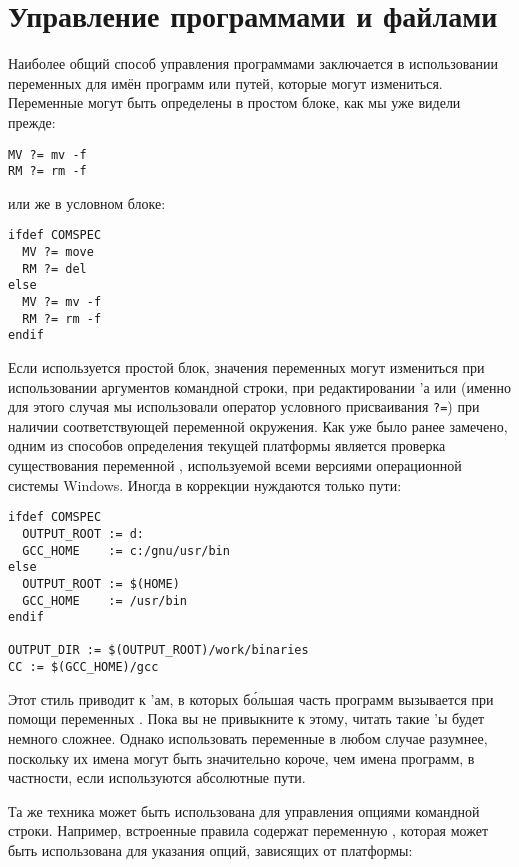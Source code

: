 \section{Управление программами и файлами}

Наиболее общий способ управления программами заключается в
использовании переменных для имён программ или путей, которые могут
измениться. Переменные могут быть определены в простом блоке, как мы
уже видели прежде:
{\footnotesize
\begin{verbatim}
MV ?= mv -f
RM ?= rm -f
\end{verbatim}
}
{\flushleft или же в условном блоке:}
{\footnotesize
\begin{verbatim}
ifdef COMSPEC
  MV ?= move
  RM ?= del
else
  MV ?= mv -f
  RM ?= rm -f
endif
\end{verbatim}
}

Если используется простой блок, значения переменных могут измениться
при использовании аргументов командной строки, при редактировании
\Makefile{}'а или (именно для этого случая мы использовали оператор
условного присваивания \texttt{?=}) при наличии соответствующей
переменной окружения. Как уже было ранее замечено, одним из способов
определения текущей платформы является проверка существования
переменной , используемой всеми версиями
операционной системы Windows. Иногда в коррекции нуждаются только
пути:

{\footnotesize
\begin{verbatim}
ifdef COMSPEC
  OUTPUT_ROOT := d:
  GCC_HOME    := c:/gnu/usr/bin
else
  OUTPUT_ROOT := $(HOME)
  GCC_HOME    := /usr/bin
endif

OUTPUT_DIR := $(OUTPUT_ROOT)/work/binaries
CC := $(GCC_HOME)/gcc
\end{verbatim}
}

Этот стиль приводит к \Makefile{}'ам, в которых б\'{о}льшая часть
программ вызывается при помощи переменных \GNUmake{}. Пока вы не
привыкните к этому, читать такие \Makefile{}'ы будет немного сложнее.
Однако использовать переменные в любом случае разумнее, поскольку их
имена могут быть значительно короче, чем имена программ, в частности,
если используются абсолютные пути.

Та же техника может быть использована для управления опциями командной
строки. Например, встроенные правила содержат переменную
, которая может быть использована для указания
опций, зависящих от платформы:

